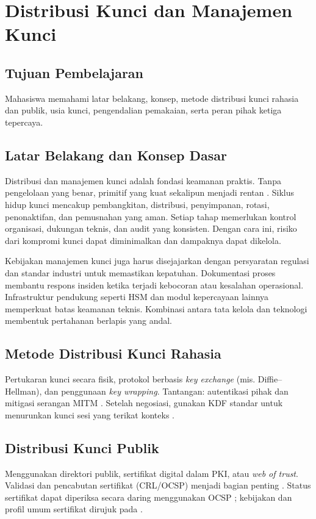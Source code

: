 \documentclass[../main.tex]{subfiles}
\begin{document}
\chapter{Distribusi Kunci dan Manajemen Kunci}

\section{Tujuan Pembelajaran}
Mahasiswa memahami latar belakang, konsep, metode distribusi kunci rahasia dan publik, usia kunci, pengendalian pemakaian, serta peran pihak ketiga tepercaya.

\section{Latar Belakang dan Konsep Dasar}
Distribusi dan manajemen kunci adalah fondasi keamanan praktis. Tanpa pengelolaan yang benar, primitif yang kuat sekalipun menjadi rentan \citep{stallings}. Siklus hidup kunci mencakup pembangkitan, distribusi, penyimpanan, rotasi, penonaktifan, dan pemusnahan yang aman. Setiap tahap memerlukan kontrol organisasi, dukungan teknis, dan audit yang konsisten. Dengan cara ini, risiko dari kompromi kunci dapat diminimalkan dan dampaknya dapat dikelola.

Kebijakan manajemen kunci juga harus disejajarkan dengan persyaratan regulasi dan standar industri untuk memastikan kepatuhan. Dokumentasi proses membantu respons insiden ketika terjadi kebocoran atau kesalahan operasional. Infrastruktur pendukung seperti HSM dan modul kepercayaan lainnya memperkuat batas keamanan teknis. Kombinasi antara tata kelola dan teknologi membentuk pertahanan berlapis yang andal.

\section{Metode Distribusi Kunci Rahasia}
Pertukaran kunci secara fisik, protokol berbasis \emph{key exchange} (mis. Diffie--Hellman), dan penggunaan \emph{key wrapping}. Tantangan: autentikasi pihak dan mitigasi serangan MITM \citep{diffiehellman,katzlindell}. Setelah negosiasi, gunakan KDF standar untuk menurunkan kunci sesi yang terikat konteks \citep{nist_sp_800_108,nist_sp_800_56c_r2}.

\section{Distribusi Kunci Publik}
Menggunakan direktori publik, sertifikat digital dalam PKI, atau \emph{web of trust}. Validasi dan pencabutan sertifikat (CRL/OCSP) menjadi bagian penting \citep{stallings}. Status sertifikat dapat diperiksa secara daring menggunakan OCSP \citep{rfc6960}; kebijakan dan profil umum sertifikat dirujuk pada \citep{rfc5280}.
\end{document}
